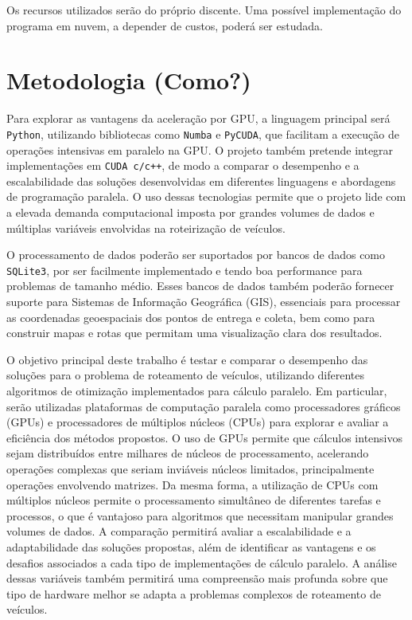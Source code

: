 \documentclass[
    openany,
    12pt,
    a4paper,
    twoside,
    english,
    brazil, sumario=tradicional
]{/home/lucas_galdino/Desktop/TCC/planning/abntex2/abntex2}
\begin{document}
Os recursos utilizados serão do próprio discente. Uma possível implementação do programa em nuvem, a depender de custos, poderá ser estudada.

\chapter{Metodologia (Como?)}

Para explorar as vantagens da aceleração por GPU, a linguagem principal será \verb|Python|, utilizando bibliotecas como \verb|Numba| e \verb|PyCUDA|, que facilitam a execução de operações intensivas em paralelo na GPU\@. O projeto também pretende integrar implementações em \verb|CUDA c/c++|, de modo a comparar o desempenho e a escalabilidade das soluções desenvolvidas em diferentes linguagens e abordagens de programação paralela. O uso dessas tecnologias permite que o projeto lide com a elevada demanda computacional imposta por grandes volumes de dados e múltiplas variáveis envolvidas na roteirização de veículos.

O processamento de dados poderão ser suportados por bancos de dados como \verb|SQLite3|, por ser facilmente implementado e tendo boa performance para problemas de tamanho médio. Esses bancos de dados também poderão fornecer suporte para Sistemas de Informação Geográfica (GIS), essenciais para processar as coordenadas geoespaciais dos pontos de entrega e coleta, bem como para construir mapas e rotas que permitam uma visualização clara dos resultados.

O objetivo principal deste trabalho é testar e comparar o desempenho das soluções para o problema de roteamento de veículos, utilizando diferentes algoritmos de otimização implementados para cálculo paralelo. Em particular, serão utilizadas plataformas de computação paralela como processadores gráficos (GPUs) e processadores de múltiplos núcleos (CPUs) para explorar e avaliar a eficiência dos métodos propostos. O uso de GPUs permite que cálculos intensivos sejam distribuídos entre milhares de núcleos de processamento, acelerando operações complexas que seriam inviáveis núcleos limitados, principalmente operações envolvendo matrizes. Da mesma forma, a utilização de CPUs com múltiplos núcleos permite o processamento simultâneo de diferentes tarefas e processos, o que é vantajoso para algoritmos que necessitam manipular grandes volumes de dados. A comparação permitirá avaliar a escalabilidade e a adaptabilidade das soluções propostas, além de identificar as vantagens e os desafios associados a cada tipo de implementações de cálculo paralelo. A análise dessas variáveis também permitirá uma compreensão mais profunda sobre que tipo de hardware melhor se adapta a problemas complexos de roteamento de veículos.
\end{document}
